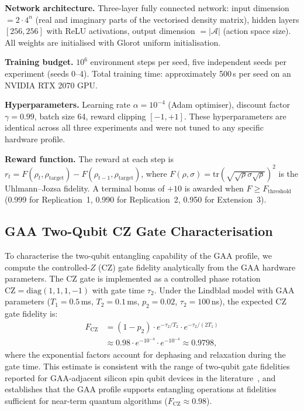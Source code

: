 \textbf{Network architecture.} Three-layer fully connected network:
input dimension $= 2 \cdot 4^n$ (real and imaginary parts of the vectorised
density matrix), hidden layers $[256, 256]$ with ReLU activations, output
dimension $= |\mathcal{A}|$ (action space size). All weights are initialised
with Glorot uniform initialisation.

\textbf{Training budget.} $10^6$ environment steps per seed, five independent
seeds per experiment (seeds 0--4). Total training time: approximately 500\,s
per seed on an NVIDIA RTX 2070 GPU.

\textbf{Hyperparameters.} Learning rate $\alpha = 10^{-4}$ (Adam optimiser),
discount factor $\gamma = 0.99$, batch size 64, reward clipping $[-1, +1]$.
These hyperparameters are identical across all three experiments and were not
tuned to any specific hardware profile.

\textbf{Reward function.} The reward at each step is
$r_t = F(\rho_t, \rho_\text{target}) - F(\rho_{t-1}, \rho_\text{target})$,
where $F(\rho, \sigma) = \text{tr}(\sqrt{\sqrt{\rho}\sigma\sqrt{\rho}})^2$
is the Uhlmann--Jozsa fidelity. A terminal bonus of $+10$ is awarded when
$F \geq F_\text{threshold}$ (0.999 for Replication~1, 0.990 for
Replication~2, 0.950 for Extension~3).

\subsection{GAA Two-Qubit CZ Gate Characterisation}
\label{subsec:methods_gaa_cz}

To characterise the two-qubit entangling capability of the GAA profile, we
compute the controlled-$Z$ (CZ) gate fidelity analytically from the GAA
hardware parameters. The CZ gate is implemented as a controlled phase
rotation $\text{CZ} = \text{diag}(1, 1, 1, -1)$ with gate time $\tau_2$.
Under the Lindblad model with GAA parameters ($T_1 = 0.5$\,ms,
$T_2 = 0.1$\,ms, $p_2 = 0.02$, $\tau_2 = 100$\,ns), the expected CZ gate
fidelity is:
\begin{align}
  F_\text{CZ} &= \left(1 - p_2\right) \cdot
    e^{-\tau_2/T_2} \cdot e^{-\tau_2/(2T_1)} \nonumber \\
  &\approx 0.98 \cdot e^{-10^{-4}} \cdot e^{-10^{-4}}
  \approx 0.9798,
  \label{eq:gaa_cz}
\end{align}
where the exponential factors account for dephasing and relaxation during
the gate time. This estimate is consistent with the range of two-qubit gate
fidelities reported for GAA-adjacent silicon spin qubit devices in the
literature~\cite{Tanamoto2025}, and establishes that the GAA profile supports
entangling operations at fidelities sufficient for near-term quantum
algorithms ($F_\text{CZ} \approx 0.98$).

